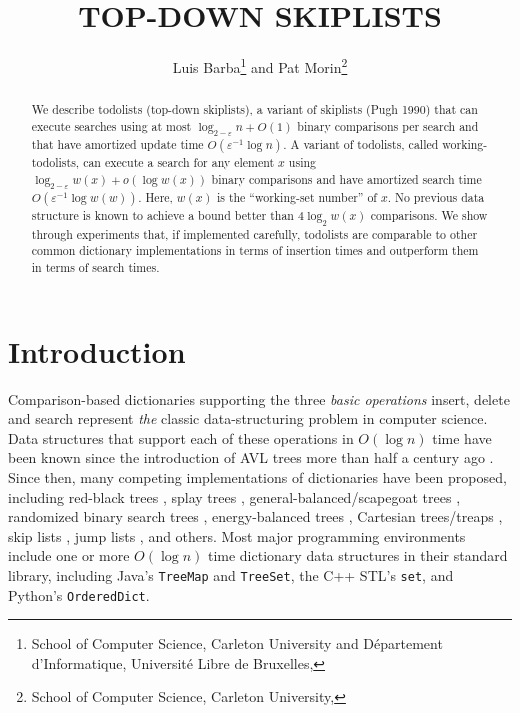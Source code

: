 \documentclass{patmorin}
\title{\MakeUppercase{Top-Down Skiplists}}
\author{Luis Barba\thanks{School of Computer Science, Carleton University
             and Département d'Informatique, 
             Université Libre de Bruxelles,
             \email{lbarbafl@ulb.ac.be}}\enspace
     and Pat Morin\thanks{School of Computer Science, Carleton University,
             \email{morin@scs.carleton.ca}}}
\newcommand{\eps}{\varepsilon}
\begin{document}
\begin{titlepage}
\maketitle

\begin{abstract}
  We describe todolists (top-down skiplists), a variant of skiplists
  (Pugh 1990) that can execute searches using at most $\log_{2-\eps} n +
  O(1)$ binary comparisons per search and that have amortized update time
  $O(\eps^{-1}\log n)$. A variant of todolists, called working-todolists,
  can execute a search for any element $x$ using $\log_{2-\eps} w(x)
  + o(\log w(x))$ binary comparisons and have amortized search time
  $O(\eps^{-1}\log w(w))$. Here, $w(x)$ is the ``working-set number'' of
  $x$. No previous data structure is known to achieve a bound better
  than $4\log_2 w(x)$ comparisons. We show through experiments that,
  if implemented carefully, todolists are comparable to other common
  dictionary implementations in terms of insertion times and outperform
  them in terms of search times.
\end{abstract}

\end{titlepage}

\section{Introduction}

Comparison-based dictionaries supporting the three \emph{basic
operations} insert, delete and search represent \emph{the} classic
data-structuring problem in computer science.  Data structures that
support each of these operations in $O(\log n)$ time have been known
since the introduction of AVL trees more than half a century ago
\cite{adelson-velskii.landis:algorithm}.  Since then, many competing
implementations of dictionaries have been proposed, including
red-black trees \cite{guibas.sedgewick:dichromatic}, splay trees
\cite{sleator.tarjan:self-adjusting}, general-balanced/scapegoat
trees \cite{andersson:general,galperin.rivest:scapegoat},
randomized binary search trees \cite{martinez:randomized},
energy-balanced trees \cite{goodrich:competitive}, Cartesian trees/treaps
\cite{aragon.seidel:randomized,vuillemin:unifying}, skip lists
\cite{pugh:skip}, jump lists \cite{bronnimann.cazals.ea:randomized},
and others.  Most major programming environments include one or more
$O(\log n)$ time dictionary data structures in their standard library,
including Java's \texttt{TreeMap} and \texttt{TreeSet}, the C++ STL's
\texttt{set}, and Python's \texttt{OrderedDict}.
\end{document}
